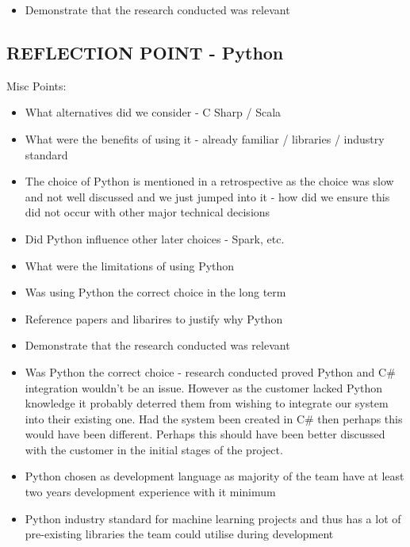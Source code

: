 \documentclass{l3proj}
\begin{document}
\begin{itemize}
\item Demonstrate that the research conducted was relevant
\end{itemize}


\subsection{REFLECTION POINT - Python}
\label{sec:pyreflection}

Misc Points:
\begin{itemize}
\item What alternatives did we consider - C Sharp / Scala
\item What were the benefits of using it - already familiar / libraries / industry standard
\item The choice of Python is mentioned in a retrospective as the choice was slow and not well discussed and we just jumped into it - how did we ensure this did not occur with other major technical decisions
\item Did Python influence other later choices - Spark, etc.
\item What were the limitations of using Python
\item Was using Python the correct choice in the long term 
\item Reference papers and libarires to justify why Python 
\item Demonstrate that the research conducted was relevant
\item Was Python the correct choice - research conducted proved Python and C\# integration wouldn't be an issue. However as the customer lacked Python knowledge it probably deterred them from wishing to integrate our system into their existing one. Had the system been created in C\# then perhaps this would have been different. Perhaps this should have been better discussed with the customer in the initial stages of the project.
\item Python chosen as development language as majority of the team have at least two years development experience with it minimum
\item Python industry standard for machine learning projects and thus has a lot of pre-existing libraries the team could utilise during development
\end{itemize}
\end{document}
